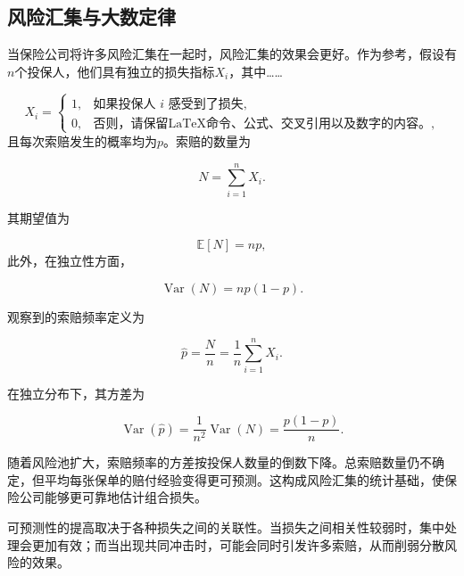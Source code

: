 \subsection{风险汇集与大数定律}

当保险公司将许多风险汇集在一起时，风险汇集的效果会更好。作为参考，假设有$n$个投保人，他们具有独立的损失指标$X_i$，其中……

$$
X_i=
\begin{cases}
1, & \text{如果投保人 } i \text{ 感受到了损失},\\
0, & \text{否则，请保留LaTeX命令、公式、交叉引用以及数字的内容。},
\end{cases}
$$
且每次索赔发生的概率均为$p$。索赔的数量为

\begin{equation}
N=\sum_{i=1}^{n}X_i.
\label{eq:ch15-number-of-claims}
\end{equation}

其期望值为

\begin{equation}
\mathbb{E}[N]=np,
\label{eq:ch15-expected-claims}
\end{equation}
此外，在独立性方面，

\begin{equation}
\operatorname{Var}(N)=np(1-p).
\label{eq:ch15-claims-variance}
\end{equation}

观察到的索赔频率定义为

\begin{equation}
\hat p=\frac{N}{n}
=\frac{1}{n}\sum_{i=1}^{n}X_i.
\end{equation}

在独立分布下，其方差为

\begin{equation}
\operatorname{Var}(\hat p)
=\frac{1}{n^2}\operatorname{Var}(N)=\frac{p(1-p)}{n}.
\label{eq:ch15-frequency-variance}
\end{equation}

随着风险池扩大，索赔频率的方差按投保人数量的倒数下降。总索赔数量仍不确定，但平均每张保单的赔付经验变得更可预测。这构成风险汇集的统计基础，使保险公司能够更可靠地估计组合损失。

可预测性的提高取决于各种损失之间的关联性。当损失之间相关性较弱时，集中处理会更加有效；而当出现共同冲击时，可能会同时引发许多索赔，从而削弱分散风险的效果。

